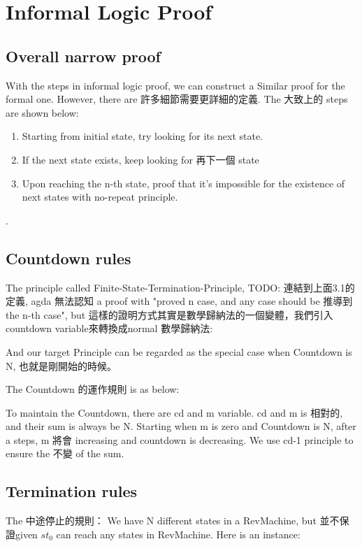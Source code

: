 \section{Informal Logic Proof}

\subsection{ Overall narrow proof }

With the steps in informal logic proof, we can construct a Similar proof for the formal one.  However, there are 許多細節需要更詳細的定義.
The 大致上的 steps are shown below:
\begin{enumerate}[1.]
\item Starting from initial state, try looking for its next state. 
\item If the next state exists, keep looking for 再下一個 state
\item Upon reaching the n-th state, proof that it's impossible for the existence of next states with no-repeat principle.
\end{enumerate}.

\subsection{ Countdown rules }
The principle called Finite-State-Termination-Principle, {TODO: 連結到上面3.1的定義}, agda 無法認知 a proof with "proved n case, and any case should be 推導到 the n-th case", but 這樣的證明方式其實是數學歸納法的一個變體，我們引入countdown variable來轉換成normal 數學歸納法:


And our target Principle can be regarded as the special case when Countdown is N, 也就是剛開始的時候。

The Countdown 的運作規則 is as below:


To maintain the Countdown, there are cd and m variable.  cd and m is 相對的, and their sum is always be N.  Starting when m is zero and Countdown is N, after a steps, m 將會 increasing and countdown is decreasing.  We use cd-1 principle to ensure the 不變 of the sum.

\subsection{ Termination rules }
The 中途停止的規則：
We have N different states in a RevMachine, but 並不保證given $st_{0}$ can reach any states in RevMachine.  Here is an instance: 



